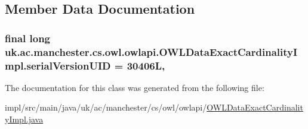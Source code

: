 \subsection{Member Data Documentation}
\hypertarget{classuk_1_1ac_1_1manchester_1_1cs_1_1owl_1_1owlapi_1_1_o_w_l_data_exact_cardinality_impl_a04601ba352d361efee99c81d724eb8d5}{
\subsubsection[{serial\-Version\-U\-I\-D}]{\setlength{\rightskip}{0pt plus 5cm}final long uk.\-ac.\-manchester.\-cs.\-owl.\-owlapi.\-O\-W\-L\-Data\-Exact\-Cardinality\-Impl.\-serial\-Version\-U\-I\-D = 30406\-L\hspace{0.3cm}{\ttfamily [static]}, {\ttfamily [private]}}}\label{classuk_1_1ac_1_1manchester_1_1cs_1_1owl_1_1owlapi_1_1_o_w_l_data_exact_cardinality_impl_a04601ba352d361efee99c81d724eb8d5}


The documentation for this class was generated from the following file\-:\begin{DoxyCompactItemize}
\item 
impl/src/main/java/uk/ac/manchester/cs/owl/owlapi/\hyperlink{_o_w_l_data_exact_cardinality_impl_8java}{O\-W\-L\-Data\-Exact\-Cardinality\-Impl.\-java}\end{DoxyCompactItemize}
